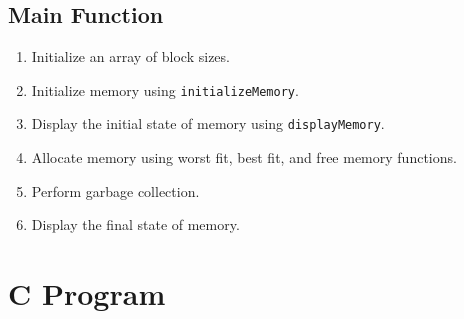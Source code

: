 \subsection{Main Function}
\begin{enumerate}[label=\arabic*.,left=0pt]
  \item Initialize an array of block sizes.
  \item Initialize memory using \texttt{initializeMemory}.
  \item Display the initial state of memory using \texttt{displayMemory}.
  \item Allocate memory using worst fit, best fit, and free memory functions.
  \item Perform garbage collection.
  \item Display the final state of memory.
\end{enumerate}

\section{C Program}

